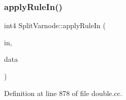 \subsubsection{\texorpdfstring{applyRuleIn()}{applyRuleIn()}}
{\footnotesize\ttfamily int4 Split\+Varnode\+::apply\+Rule\+In (\begin{DoxyParamCaption}\item[{\mbox{\hyperlink{class_split_varnode}{Split\+Varnode}} \&}]{in,  }\item[{\mbox{\hyperlink{class_funcdata}{Funcdata}} \&}]{data }\end{DoxyParamCaption})\hspace{0.3cm}{\ttfamily [static]}}



Definition at line 878 of file double.\+cc.


